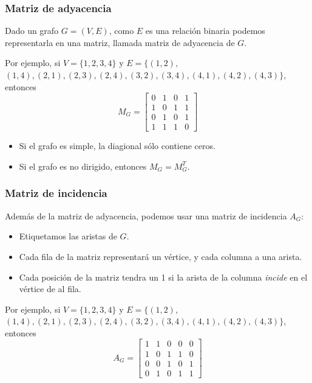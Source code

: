 \begin{multicols}{2}
    \subsubsection*{Matriz de adyacencia}
    Dado un grafo $G = (V,E)$, como $E$ es una relación binaria podemos representarla en una matriz, llamada matriz de adyacencia de $G$. \p
    
    Por ejemplo, si $V = \{1,2,3,4\}$ y $E = \{ (1,2),$
    $(1,4), (2,1), (2,3), (2,4), (3,2), (3,4), (4,1), (4,2), (4,3) \}$, entonces
    $$
    M_G = \begin{bmatrix}
        0 & 1 & 0 & 1 \\
        1 & 0 & 1 & 1 \\
        0 & 1 & 0 & 1 \\
        1 & 1 & 1 & 0 
        \end{bmatrix}
    $$
    
    \begin{itemize}
        \item Si el grafo es simple, la diagional sólo contiene ceros.
        \item Si el grafo es no dirigido, entonces $M_G = M_G^T$.
    \end{itemize}
    
    \subsubsection*{Matriz de incidencia}
    Además de la matriz de adyacencia, podemos usar una matriz de incidencia $A_G$:
    \begin{itemize}
        \item Etiquetamos las aristas de $G$.
        \item Cada fila de la matriz representará un vértice, y cada columna a una arista.
        \item Cada posición de la matriz tendra un 1 si la arista de la columna \textit{incide} en el vértice de al fila.
    \end{itemize}
    
    Por ejemplo, si $V = \{1,2,3,4\}$ y $E = \{ (1,2),$
    $(1,4), (2,1), (2,3), (2,4), (3,2), (3,4), (4,1), (4,2), (4,3) \}$, entonces
    $$
    A_G = \begin{bmatrix}
        1 & 1 & 0 & 0 & 0 \\
        1 & 0 & 1 & 1 & 0\\
        0 & 0 & 1 & 0 & 1\\
        0 & 1 & 0 & 1 & 1
        \end{bmatrix}
    $$
    

\end{multicols}
